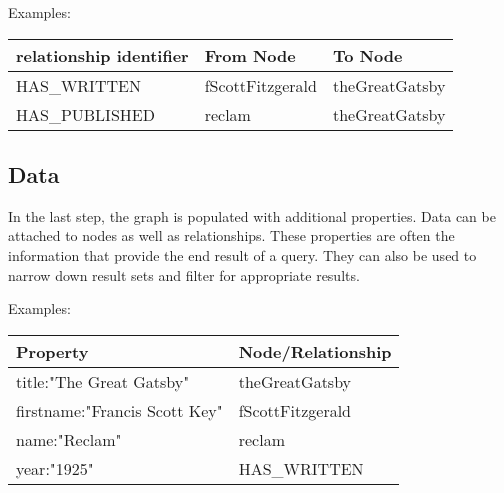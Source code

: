 Examples:
\begin{tabular}{ | l | l | l | }
  \hline
  \textbf{relationship identifier} & \textbf{From Node} & \textbf{To Node} \\
  \hline
  HAS\_WRITTEN & fScottFitzgerald & theGreatGatsby \\
  \hline
  HAS\_PUBLISHED & reclam & theGreatGatsby \\
  \hline
\end{tabular}
	
\subsection{Data}
In the last step, the graph is populated with additional properties. Data can be attached to nodes as well as relationships. These properties are often the information that provide the end result of a query. They can also be used to narrow down result sets and filter for appropriate results.

Examples:
\begin{tabular}{ | l | l | }
  \hline
  \textbf{Property} & \textbf{Node/Relationship} \\
  \hline
  title:"The Great Gatsby" & theGreatGatsby \\
  \hline
  firstname:"Francis Scott Key" & fScottFitzgerald \\
  \hline
  name:"Reclam" & reclam \\
  \hline
  year:"1925" & HAS\_WRITTEN \\
  \hline
\end{tabular}